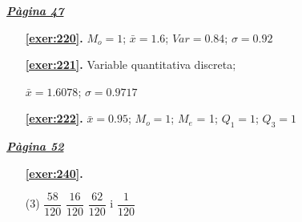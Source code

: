 
\hyperlink{page.47}{\textbf{\em Pàgina 47}}
\begin{enumerate}
\item[\fontfamily{phv}\selectfont\color{blue}\textbf{\ref{exer:220}. }] \label{ans:220} 
$M_o =1$; $\bar x=1.6$; $Var=0.84$; $\sigma =0.92$\par {}
 \end{enumerate}
\begin{enumerate}
\item[\fontfamily{phv}\selectfont\color{blue}\textbf{\ref{exer:221}. }] \label{ans:221} 
Variable quantitativa discreta;\par $\bar x=1.6078$; $\sigma =0.9717$\par {}
\item[\fontfamily{phv}\selectfont\color{blue}\textbf{\ref{exer:222}. }] \label{ans:222} 
$\bar x=0.95$; $M_o=1$; $M_e$ = 1; $Q_1 = 1$; $Q_3= 1$ \par {} 
 \end{enumerate}
\vspace{0.3cm}


\hyperlink{page.52}{\textbf{\em Pàgina 52}}
\begin{enumerate}



 \item[\fontfamily{phv}\selectfont\color{blue}\textbf{\ref{exer:240}. }] \label{ans:240}
 \begin{tasks}[column-sep=1em, item-indent=1.3333em](3)
	 \task $\dfrac {58}{120}$
	 \task $\dfrac {16}{120}$
	 \task* $\dfrac {62}{120}$ i $\dfrac {1}{120}$ 
\end{tasks}
 \end{enumerate}
\vspace{0.3cm}


